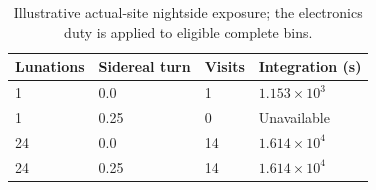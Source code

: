 \begin{table}[htbp]
\centering\small
\caption{Illustrative actual-site nightside exposure; the electronics duty is applied to eligible complete bins.}
\label{tab:exposure}
\begin{tabular}{llll}
\toprule
Lunations & Sidereal turn & Visits & Integration (s)\\
\midrule
1 & 0.0 & 1 & $1.153\times10^{3}$\\
1 & 0.25 & 0 & Unavailable\\
24 & 0.0 & 14 & $1.614\times10^{4}$\\
24 & 0.25 & 14 & $1.614\times10^{4}$\\
\bottomrule
\end{tabular}
\end{table}
